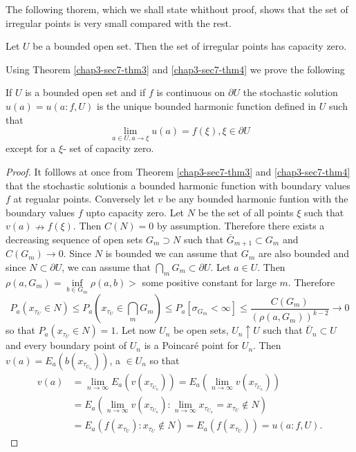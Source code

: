 The following thorem, which we shall state whithout proof, shows that
the set of irregular points is very small compared with the rest. 

\begin{thm}\label{chap3-sec7-thm4}%
Let $U$ be a bounded open set. Then the set of irregular points has
  capacity zero. 
\end{thm}

Using Theorem \ref{chap3-sec7-thm3} and \ref{chap3-sec7-thm4} we prove
the following 

\begin{thm}\label{chap3-sec7-thm5}%
  If $U$ is a bounded open set and if $f$ is continuous on $\partial
  U$ the stochastic solution $u(a)=u(a:f,U)$ is the unique bounded
  harmonic function defined in $U$ such that 
  $$
  \lim_{a \in U,a \to \xi} u(a)=f(\xi),\xi \in \partial U
  $$
  except for a $\xi$- set of capacity zero.
\end{thm}

\begin{proof}
It folllows at once from Theorem \ref{chap3-sec7-thm3} and 
\ref{chap3-sec7-thm4} that the
stochastic solution\pageoriginale is a bounded harmonic function with
boundary values $f$ at 
  regualar points. Conversely let $v$ be any bounded harmonic funtion
  with the boundary values $f$ upto capacity zero. Let $N$ be the 
  set of all points $\xi$ such that $v(a)\nrightarrow
  f(\xi)$. Then $C(N)=0$ by assumption. Therefore there exists a
  decreasing sequence of open sets $G_m \supset N$ such that
  $\bar{G}_{m+1}\subset G_m$ and $C(G_m) \to 0$. Since $N$ is bounded
  we can assume that $G_m$ are also bounded and since $N \subset
  \partial U$, we can assume that $\bigcap \limits_m G_m \subset
  \partial U$. Let $a \in U$. Then $\rho (a,G_m)= \inf \limits_{b \in
    G_m}\rho (a,b)>$ some positive constant for large $m$. Therefore  
{\fontsize{10pt}{12pt}\selectfont
  $$
  P_a (x_{\tau_U} \in N)\leq P_a \left(x_{\tau_U}\in \bigcap_m G_m\right)\leq P_a
  [\sigma_{G_m}< \infty] \leq \frac{C(G_m)}{(\rho(a,G_m))^{k-2}} \to 0 
  $$}\relax
  so that $P_a (x_{\tau_U} \in N)=1$. Let now $U_n$ be open sets, $U_n
  \uparrow U$ such that $\bar{U}_n \subset U$ and every boundary point
  of $U_n$ is a Poincar\'e point for $U_n$. Then
  $v(a)=E_a(b(x_{\tau_{U_n}}))$, a $\in U_n$ so that 
  \begin{align*}
    v(a)& = \lim_ {n \to \infty} E_a(v(x_{\tau_{U_n}}))=E_a (\lim_ {n \to
      \infty} v(x_{\tau_{U_n}}))\\
    &= E_a (\lim_ {n \to \infty} v(x_{\tau_{U_n}}):\lim_ {n \to
      \infty} x_{\tau_{U_n}}=x_{\tau_{U}} \notin N)\\ 
    &=E_a(f(x_{\tau_{U}}): x_{\tau_{U}} \notin N)=E_a(f(x_{\tau_{U}}))=u(a:f,U).
  \end{align*}
\end{proof}

